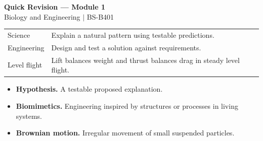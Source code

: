 \documentclass[12pt,a4paper]{article}
\renewcommand{\arraystretch}{1.45}
\begin{document}
\newpage
\begin{center}
  {\large\bfseries\color{myred} Quick Revision --- Module 1}\\[3pt]
  {\small\color{mydark} Biology and Engineering $|$ BS-B401}
\end{center}
\noindent{\color{myred}\rule{\linewidth}{1.2pt}}\par\vspace{4pt}

\begin{tcolorbox}[formulabox, title={Key Concepts at a Glance}]
\renewcommand{\arraystretch}{1.35}
\noindent\begin{tabularx}{\linewidth}{B{4.5cm}Y}
Science & Explain a natural pattern using testable predictions. \\[3pt]
Engineering & Design and test a solution against requirements. \\[3pt]
Level flight & Lift balances weight and thrust balances drag in steady level flight. \\[3pt]
\end{tabularx}\par
\end{tcolorbox}

\begin{tcolorbox}[defbox, title={One-Line Definitions}]
\begin{itemize}[leftmargin=*, itemsep=3pt, topsep=4pt]
  \item \textbf{Hypothesis.} A testable proposed explanation.
  \item \textbf{Biomimetics.} Engineering inspired by structures or processes in living systems.
  \item \textbf{Brownian motion.} Irregular movement of small suspended particles.
\end{itemize}
\end{tcolorbox}
\end{document}
